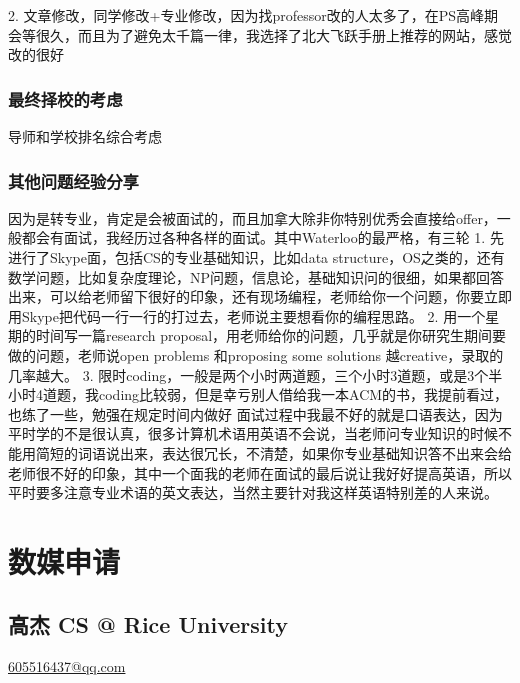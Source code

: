 \documentclass[11pt,fleqn,openany]{book} %
\begin{document}
2. 文章修改，同学修改+专业修改，因为找professor改的人太多了，在PS高峰期会等很久，而且为了避免太千篇一律，我选择了北大飞跃手册上推荐的网站，感觉改的很好
\subsection*{最终择校的考虑}
导师和学校排名综合考虑
\subsection*{其他问题经验分享}
因为是转专业，肯定是会被面试的，而且加拿大除非你特别优秀会直接给offer，一般都会有面试，我经历过各种各样的面试。其中Waterloo的最严格，有三轮
1. 先进行了Skype面，包括CS的专业基础知识，比如data structure，OS之类的，还有数学问题，比如复杂度理论，NP问题，信息论，基础知识问的很细，如果都回答出来，可以给老师留下很好的印象，还有现场编程，老师给你一个问题，你要立即用Skype把代码一行一行的打过去，老师说主要想看你的编程思路。
2. 用一个星期的时间写一篇research proposal，用老师给你的问题，几乎就是你研究生期间要做的问题，老师说open problems 和proposing some solutions 越creative，录取的几率越大。
3. 限时coding，一般是两个小时两道题，三个小时3道题，或是3个半小时4道题，我coding比较弱，但是幸亏别人借给我一本ACM的书，我提前看过，也练了一些，勉强在规定时间内做好
    面试过程中我最不好的就是口语表达，因为平时学的不是很认真，很多计算机术语用英语不会说，当老师问专业知识的时候不能用简短的词语说出来，表达很冗长，不清楚，如果你专业基础知识答不出来会给老师很不好的印象，其中一个面我的老师在面试的最后说让我好好提高英语，所以平时要多注意专业术语的英文表达，当然主要针对我这样英语特别差的人来说。
\clearpage
\cleardoublepage
\chapter{数媒申请}
\section{高杰 CS @ Rice University}
\hfill \href{mailto:605516437@qq.com}{605516437@qq.com}
\end{document}
